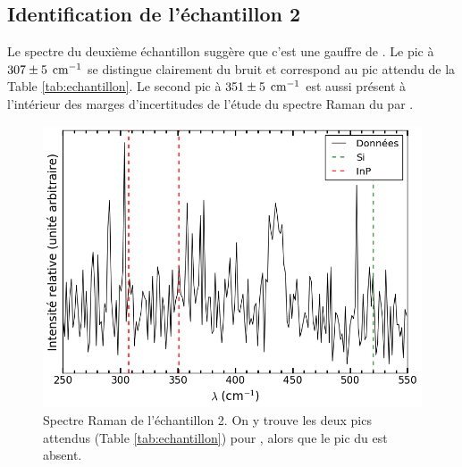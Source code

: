 \documentclass[10pt,letterpaper,twocolumn]{article}
\newcommand{\unit}[1]{\hspace{0.15cm}\text{#1}}
\begin{document}
\subsection{Identification de l'échantillon 2}
Le spectre du deuxième échantillon suggère que c'est une gauffre de . Le pic à $307\pm 5\unit{cm}^{-1}$ se distingue clairement du bruit et correspond au pic attendu de la Table \ref{tab:echantillon}. Le second pic à $351 \pm 5\unit{cm}^{-1}$ est aussi présent à l'intérieur des marges d'incertitudes de l'étude du spectre Raman du  par \citeauthor{Mooradian1966}\supercite{Mooradian1966}. 
\begin{figure}[H]
	\centering
	\includegraphics[width=0.8\linewidth]{figures/echantillon2(2).png}
	\caption{Spectre Raman de l'échantillon 2. On y trouve les deux pics attendus (Table \ref{tab:echantillon}) pour , alors que le pic du  est absent. }
	\label{fig:e2}
\end{figure}
\end{document}
